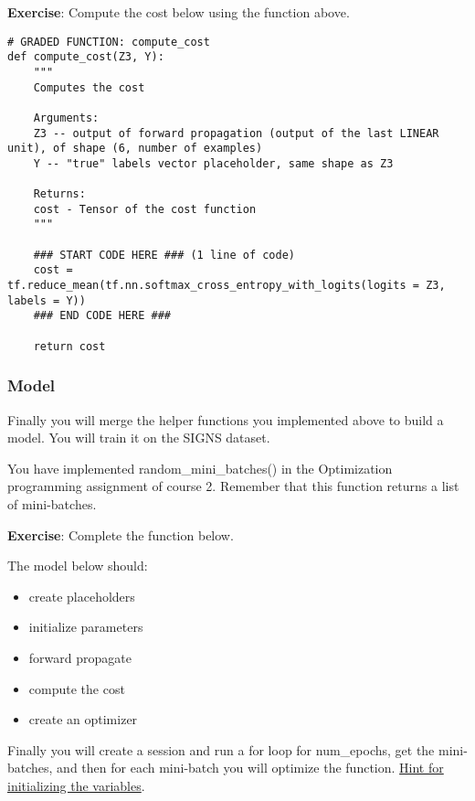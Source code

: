 {\textbf{Exercise}}: Compute the cost below using the function above.

\begin{verbatim}
# GRADED FUNCTION: compute_cost 
def compute_cost(Z3, Y):
    """
    Computes the cost
    
    Arguments:
    Z3 -- output of forward propagation (output of the last LINEAR unit), of shape (6, number of examples)
    Y -- "true" labels vector placeholder, same shape as Z3
    
    Returns:
    cost - Tensor of the cost function
    """
    
    ### START CODE HERE ### (1 line of code)
    cost = tf.reduce_mean(tf.nn.softmax_cross_entropy_with_logits(logits = Z3, labels = Y))
    ### END CODE HERE ###
    
    return cost
\end{verbatim}





\subsubsection{Model}

Finally you will merge the helper functions you implemented above to build a model. You will train it on the SIGNS dataset.

You have implemented random\_mini\_batches() in the Optimization programming assignment of course 2. Remember that this function returns a list of mini-batches.

{\textbf{Exercise}}: Complete the function below.

The model below should:
\begin{itemize}
\item create placeholders
\item initialize parameters
\item forward propagate
\item compute the cost
\item create an optimizer
\end{itemize}

Finally you will create a session and run a for loop for num\_epochs, get the mini-batches, and then for each mini-batch you will optimize the function. \href{https://www.tensorflow.org/api_docs/python/tf/global_variables_initializer}{Hint for initializing the variables}.

